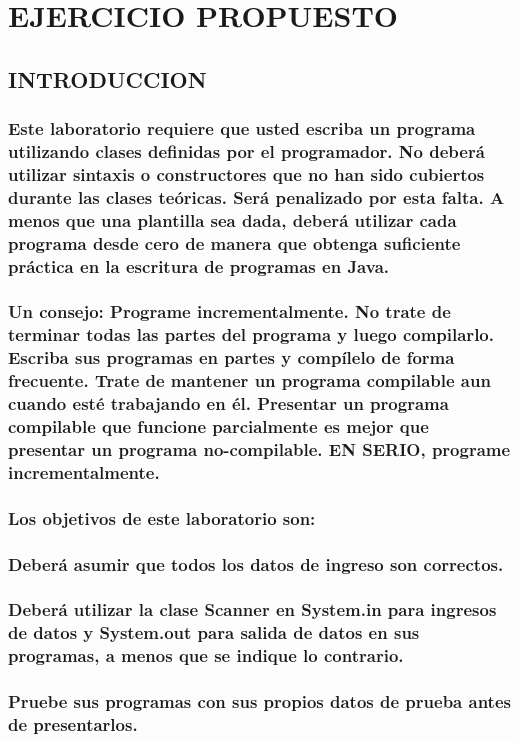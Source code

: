 \documentclass{article}
\begin{document}
    \section{EJERCICIO PROPUESTO}
	\begin{itemize}

        \subsection{INTRODUCCION}
        \subsubsection {Este laboratorio requiere que usted escriba un programa utilizando clases definidas por el programador. No deberá utilizar sintaxis o constructores que no han sido cubiertos durante las clases teóricas. Será penalizado por esta falta. A menos que una plantilla sea dada, deberá utilizar cada programa desde cero de manera que obtenga suficiente práctica en la escritura de programas en Java.}
        \subsubsection {Un consejo: Programe incrementalmente. No trate de terminar todas las partes del programa y luego compilarlo. Escriba sus programas en partes y compílelo de forma frecuente. Trate de mantener un programa compilable aun cuando esté trabajando en él. Presentar un programa compilable que funcione parcialmente es mejor que presentar un programa no-compilable.  EN SERIO, programe incrementalmente.}
        \subsubsection {Los objetivos de este laboratorio son:}
        \subsubsection {Deberá asumir que todos los datos de ingreso son correctos.}
        \subsubsection {Deberá utilizar la clase Scanner en System.in para ingresos de datos y System.out para salida de datos en sus programas, a menos que se indique lo contrario.}
        \subsubsection {Pruebe sus programas con sus propios datos de prueba antes de presentarlos.} 

\end{itemize}
\end{document}
